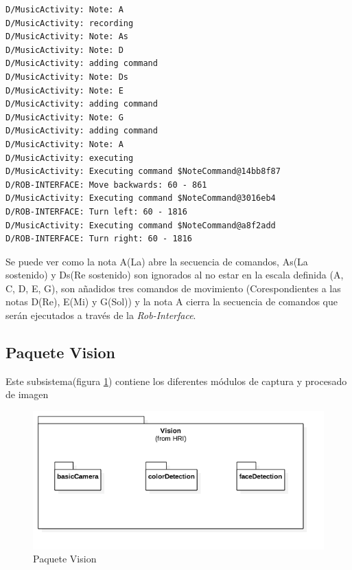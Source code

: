 \begin{verbatim}
D/MusicActivity: Note: A
D/MusicActivity: recording
D/MusicActivity: Note: As
D/MusicActivity: Note: D
D/MusicActivity: adding command
D/MusicActivity: Note: Ds
D/MusicActivity: Note: E
D/MusicActivity: adding command
D/MusicActivity: Note: G
D/MusicActivity: adding command
D/MusicActivity: Note: A
D/MusicActivity: executing
D/MusicActivity: Executing command $NoteCommand@14bb8f87
D/ROB-INTERFACE: Move backwards: 60 - 861
D/MusicActivity: Executing command $NoteCommand@3016eb4
D/ROB-INTERFACE: Turn left: 60 - 1816
D/MusicActivity: Executing command $NoteCommand@a8f2add
D/ROB-INTERFACE: Turn right: 60 - 1816
\end{verbatim} 

Se puede ver como la nota A(La) abre la secuencia de comandos, As(La sostenido) y Ds(Re sostenido) son ignorados al no estar en la escala definida (A, C, D, E, G), son añadidos tres comandos de movimiento (Corespondientes a las notas D(Re), E(Mi) y G(Sol)) y la nota A cierra la secuencia de comandos que serán ejecutados a través de la \textit{Rob-Interface}.



\newpage
\subsection{Paquete Vision}
Este subsistema(figura \ref{fig:vision-package}) contiene los diferentes módulos de captura y procesado de imagen

\begin{figure}
	\centering
	\includegraphics[width=0.8\linewidth]{imagenes/diagramas/Vision.png}
	\caption{Paquete Vision}
	\label{fig:vision-package}
\end{figure}

